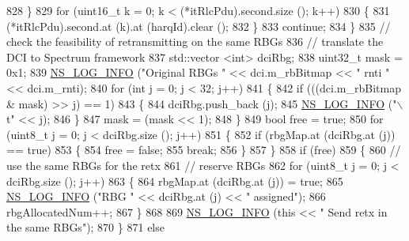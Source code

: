 \begin{DoxyCode}
828                 \}
829               \textcolor{keywordflow}{for} (uint16\_t k = 0; k < (*itRlcPdu).second.size (); k++)
830                 \{
831                   (*itRlcPdu).second.at (k).at (harqId).clear ();
832                 \}
833               \textcolor{keywordflow}{continue};
834             \}
835           \textcolor{comment}{// check the feasibility of retransmitting on the same RBGs}
836           \textcolor{comment}{// translate the DCI to Spectrum framework}
837           std::vector <int> dciRbg;
838           uint32\_t mask = 0x1;
839           \hyperlink{group__logging_gafbd73ee2cf9f26b319f49086d8e860fb}{NS\_LOG\_INFO} (\textcolor{stringliteral}{"Original RBGs "} << dci.m\_rbBitmap << \textcolor{stringliteral}{" rnti "} << dci.m\_rnti);
840           \textcolor{keywordflow}{for} (\textcolor{keywordtype}{int} j = 0; j < 32; j++)
841             \{
842               \textcolor{keywordflow}{if} (((dci.m\_rbBitmap & mask) >> j) == 1)
843                 \{
844                   dciRbg.push\_back (j);
845                   \hyperlink{group__logging_gafbd73ee2cf9f26b319f49086d8e860fb}{NS\_LOG\_INFO} (\textcolor{stringliteral}{"\(\backslash\)t"} << j);
846                 \}
847               mask = (mask << 1);
848             \}
849           \textcolor{keywordtype}{bool} free = \textcolor{keyword}{true};
850           \textcolor{keywordflow}{for} (uint8\_t j = 0; j < dciRbg.size (); j++)
851             \{
852               \textcolor{keywordflow}{if} (rbgMap.at (dciRbg.at (j)) == \textcolor{keyword}{true})
853                 \{
854                   free = \textcolor{keyword}{false};
855                   \textcolor{keywordflow}{break};
856                 \}
857             \}
858           \textcolor{keywordflow}{if} (free)
859             \{
860               \textcolor{comment}{// use the same RBGs for the retx}
861               \textcolor{comment}{// reserve RBGs}
862               \textcolor{keywordflow}{for} (uint8\_t j = 0; j < dciRbg.size (); j++)
863                 \{
864                   rbgMap.at (dciRbg.at (j)) = \textcolor{keyword}{true};
865                   \hyperlink{group__logging_gafbd73ee2cf9f26b319f49086d8e860fb}{NS\_LOG\_INFO} (\textcolor{stringliteral}{"RBG "} << dciRbg.at (j) << \textcolor{stringliteral}{" assigned"});
866                   rbgAllocatedNum++;
867                 \}
868 
869               \hyperlink{group__logging_gafbd73ee2cf9f26b319f49086d8e860fb}{NS\_LOG\_INFO} (\textcolor{keyword}{this} << \textcolor{stringliteral}{" Send retx in the same RBGs"});
870             \}
871           \textcolor{keywordflow}{else}

\end{DoxyCode}
